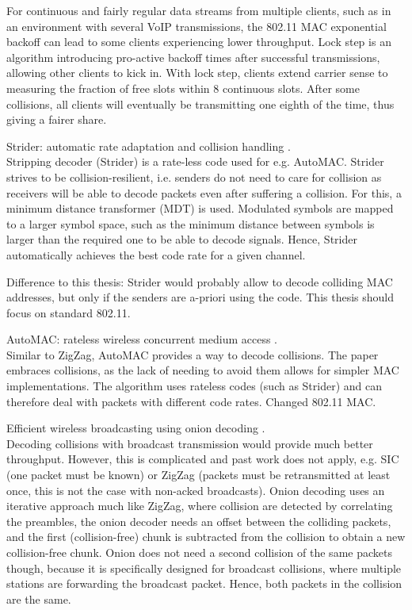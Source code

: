 For continuous and fairly regular data streams from multiple clients, such as in an environment with several VoIP transmissions, the 802.11 MAC exponential backoff can lead to some clients experiencing lower throughput. Lock step is an algorithm introducing pro-active backoff times after successful transmissions, allowing other clients to kick in. With lock step, clients extend carrier sense to measuring the fraction of free slots within 8 continuous slots. After some collisions, all clients will eventually be transmitting one eighth of the time, thus giving a fairer share.

Strider: automatic rate adaptation and collision handling \cite{gudipati2011}.\\

Stripping decoder (Strider) is a rate-less code used for e.g. AutoMAC. Strider strives to be collision-resilient, i.e. senders do not need to care for collision as receivers will be able to decode packets even after suffering a collision. For this, a minimum distance transformer (MDT) is used. Modulated symbols are mapped to a larger symbol space, such as the minimum distance between symbols is larger than the required one to be able to decode signals. Hence, Strider automatically achieves the best code rate for a given channel.

Difference to this thesis: Strider would probably allow to decode colliding MAC addresses, but only if the senders are a-priori using the code. This thesis should focus on standard 802.11.

AutoMAC: rateless wireless concurrent medium access \cite{gudipati2012}.\\

Similar to ZigZag, AutoMAC provides a way to decode collisions. The paper embraces collisions, as the lack of needing to avoid them allows for simpler MAC implementations. The algorithm uses rateless codes (such as Strider) and can therefore deal with packets with different code rates. Changed 802.11 MAC.

Efficient wireless broadcasting using onion decoding \cite{wang2010}.\\

Decoding collisions with broadcast transmission would provide much better throughput. However, this is complicated and past work does not apply, e.g. SIC (one packet must be known) or ZigZag \cite{gollakota2008} (packets must be retransmitted at least once, this is not the case with non-acked broadcasts). Onion decoding uses an iterative approach much like ZigZag, where collision are detected by correlating the preambles, the onion decoder needs an offset between the colliding packets, and the first (collision-free) chunk is subtracted from the collision to obtain a new collision-free chunk. Onion does not need a second collision of the same packets though, because it is specifically designed for broadcast collisions, where multiple stations are forwarding the broadcast packet. Hence, both packets in the collision are the same.

